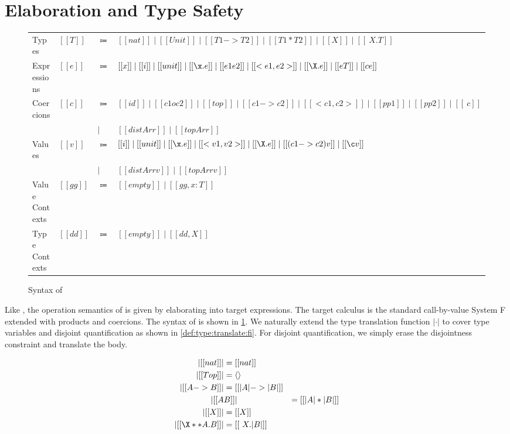 
\section{Elaboration and Type Safety}
\label{sec:elaboration:fi}



\begin{figure}
  \centering
\begin{tabular}{llll} \toprule
  Types & $[[T]]$ & $\Coloneqq$ & $[[nat]] \mid [[Unit]] \mid [[T1 -> T2]]  \mid [[T1 * T2]] \mid [[X]] \mid [[\ X . T]]$\\
  Expressions & $[[e]]$ & $\Coloneqq$ & $[[x]] \mid [[i]] \mid [[unit]] \mid [[\x . e]] \mid [[e1 e2]] \mid [[< e1 , e2>]] \mid [[\X . e]] \mid [[ e T ]] \mid [[c e]]$ \\
  Coercions & $[[c]]$ & $\Coloneqq$ & $[[id]] \mid [[c1 o c2]] \mid [[top]] \mid [[c1 -> c2]] \mid [[< c1 , c2 >]] \mid [[pp1]] \mid [[pp2]] \mid [[\ c]]$ \\
  & & $\mid$ & $ [[distArr]] \mid [[topArr]] $ \\
  Values & $[[v]]$ & $\Coloneqq$ & $[[i]] \mid [[unit]] \mid [[\x . e]] \mid [[< v1 , v2>]] \mid [[\X . e]] \mid [[ (c1 -> c2) v ]] \mid [[\c v]]  $ \\
  & & $\mid$ & $ [[distArr v]] \mid [[topArr v]] $ \\
  Value Contexts & $[[gg]]$ & $\Coloneqq$ &  $[[empty]] \mid [[gg , x : T]] $ \\
  Type Contexts & $[[dd]]$ & $\Coloneqq$ &  $[[empty]] \mid [[dd , X ]] $ \\ \bottomrule
\end{tabular}
\caption{Syntax of \tnamee}
\label{fig:syntax:fco}
\end{figure}


Like \namee, the operation semantics of \fnamee is given by elaborating into
target expressions. The target calculus \tnamee is the standard call-by-value
System F extended with products and coercions. The syntax of \tnamee is shown in
\cref{fig:syntax:fco}. We naturally extend the type translation function $| \cdot |$
to cover type variables and disjoint quantification as shown in \cref{def:type:translate:fi}.
For disjoint quantification, we simply erase the disjointness constraint and translate the body.

\begin{definition} \label{def:type:translate:fi}
  \begin{align*}
    | [[nat]] | &= [[nat]] \\
    | [[Top]] | &= \langle \rangle \\
    | [[A -> B]]  | &= [[ | A | -> | B |  ]] \\
    | [[ A & B  ]] | &= [[ | A | * | B |  ]] \\
    | [[ X  ]] | &= [[ X ]] \\
    | [[ \X ** A . B ]] | &= [[ \ X . | B | ]]
  \end{align*}
\end{definition}


